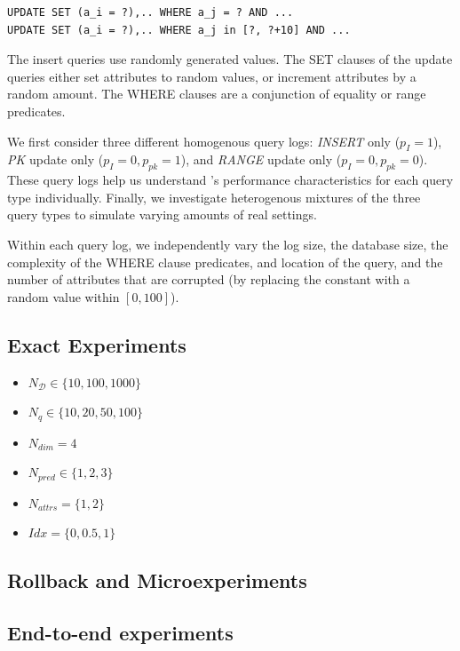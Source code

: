 {\scriptsize
\begin{verbatim}
UPDATE SET (a_i = ?),.. WHERE a_j = ? AND ...
UPDATE SET (a_i = ?),.. WHERE a_j in [?, ?+10] AND ...
\end{verbatim}
}

The insert queries use randomly generated values.  The SET clauses
of the update queries either set attributes to random values, or
increment attributes by a random amount.  The WHERE clauses are a
conjunction of equality or range predicates.

We first consider three different homogenous query logs: {\it INSERT} only ($p_I = 1$), 
{\it PK} update only ($p_I = 0, p_{pk} = 1$), and {\it RANGE} update only ($p_I = 0, p_{pk} = 0$).
These query logs help us understand \sys's performance characteristics for each query type individually.  
Finally, we investigate heterogenous mixtures of the three query types to simulate varying amounts of real settings.

Within each query log, we independently vary the log size, the
database size, the complexity of the WHERE clause predicates, and
location of the query, and the number of attributes that are corrupted
(by replacing the constant with a random value within $[0, 100]$).




\subsection{Exact Experiments}

\begin{itemize}
\item $N_\mathcal{D} \in \{10, 100, 1000\}$
\item $N_q \in \{10, 20, 50, 100\}$
\item $N_{dim} = 4$
\item $N_{pred} \in \{1, 2, 3\}$
\item $N_{attrs} = \{1, 2\}$
\item $Idx = \{0, 0.5, 1\}$
\end{itemize}

\subsection{Rollback and \qfix Microexperiments}

\subsection{End-to-end experiments}

